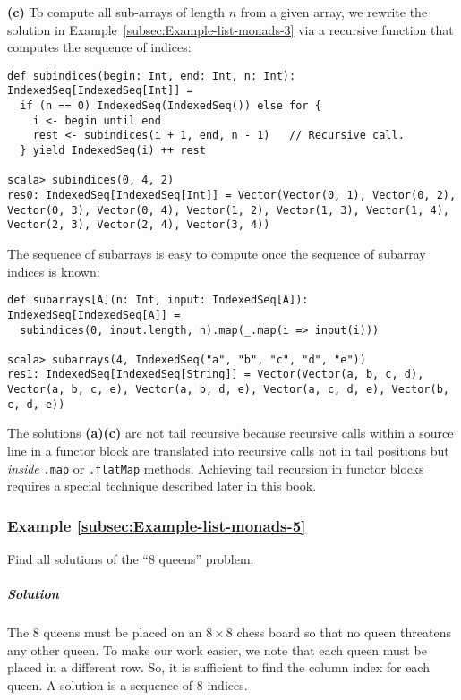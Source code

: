 \textbf{(c)} To compute all sub-arrays of length $n$ from a given
array, we rewrite the solution in Example~\ref{subsec:Example-list-monads-3}
via a recursive function that computes the sequence of indices:
\begin{lstlisting}
def subindices(begin: Int, end: Int, n: Int): IndexedSeq[IndexedSeq[Int]] =
  if (n == 0) IndexedSeq(IndexedSeq()) else for {
    i <- begin until end
    rest <- subindices(i + 1, end, n - 1)   // Recursive call.
  } yield IndexedSeq(i) ++ rest

scala> subindices(0, 4, 2)
res0: IndexedSeq[IndexedSeq[Int]] = Vector(Vector(0, 1), Vector(0, 2), Vector(0, 3), Vector(0, 4), Vector(1, 2), Vector(1, 3), Vector(1, 4), Vector(2, 3), Vector(2, 4), Vector(3, 4))
\end{lstlisting}
The sequence of subarrays is easy to compute once the sequence of
subarray indices is known: 
\begin{lstlisting}
def subarrays[A](n: Int, input: IndexedSeq[A]): IndexedSeq[IndexedSeq[A]] =
  subindices(0, input.length, n).map(_.map(i => input(i)))

scala> subarrays(4, IndexedSeq("a", "b", "c", "d", "e"))
res1: IndexedSeq[IndexedSeq[String]] = Vector(Vector(a, b, c, d), Vector(a, b, c, e), Vector(a, b, d, e), Vector(a, c, d, e), Vector(b, c, d, e))
\end{lstlisting}

The solutions \textbf{(a)}\textendash \textbf{(c)} are not tail recursive
because recursive calls within a source line in a functor block are
translated into recursive calls not in tail positions but \emph{inside}
\lstinline!.map! or \lstinline!.flatMap! methods. Achieving tail
recursion in functor blocks requires a special technique described
later in this book.

\subsubsection{Example \label{subsec:Example-list-monads-5}\ref{subsec:Example-list-monads-5}}

Find all solutions of the \textsf{``}$8$ queens\textsf{''} problem.

\subparagraph{Solution}

The $8$ queens must be placed on an $8\times8$ chess board so that
no queen threatens any other queen. To make our work easier, we note
that each queen must be placed in a different row. So, it is sufficient
to find the column index for each queen. A solution is a sequence
of $8$ indices.

